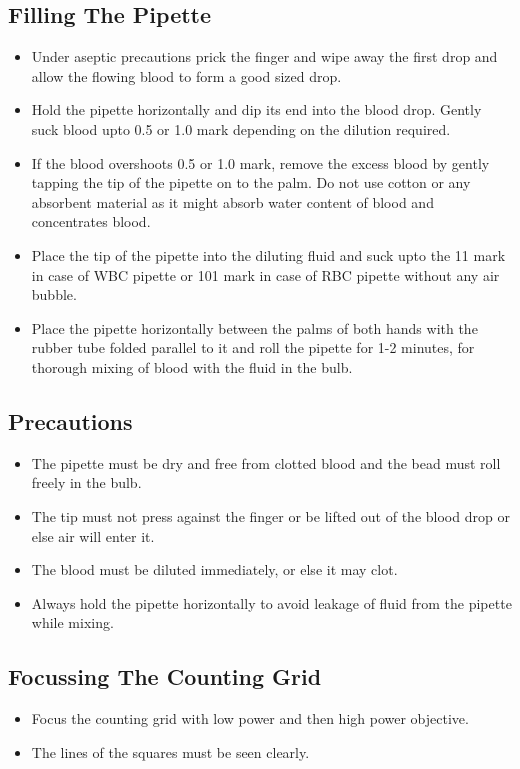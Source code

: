 \documentclass[a4paper,12pt]{book}
\begin{document}
\subsection*{Filling The Pipette}
\begin{itemize}

	\item{Under aseptic precautions prick the finger and wipe away the first drop and allow the flowing blood to form a good sized drop.}
	\item{Hold the pipette horizontally and dip its end into the blood drop. Gently suck blood upto 0.5 or 1.0 mark depending on the dilution required.}

	\item{If the blood overshoots 0.5 or 1.0 mark, remove the excess blood by gently tapping the tip of the pipette on to the palm. Do not use cotton or any absorbent material as it might absorb water content of blood and concentrates blood.}
	\item{Place the tip of the pipette into the diluting fluid and suck upto the 11 mark in case of WBC pipette or 101 mark in case of RBC pipette without any air bubble.}
	\item{Place the pipette horizontally between the palms of both hands with the rubber tube folded parallel to it and roll the pipette for 1-2 minutes, for thorough mixing of blood with the fluid in the bulb.}

\end{itemize}

\subsection*{Precautions}
\begin{itemize}

	\item{The pipette must be dry and free from clotted blood and the bead must roll freely in the bulb.}
	\item{The tip must not press against the finger or be lifted out of the blood drop or else air will enter it.}
	\item{The blood must be diluted immediately, or else it may clot.}
	\item{Always hold the pipette horizontally to avoid leakage of fluid from the pipette while mixing.}

\end{itemize}


\subsection*{Focussing The Counting Grid}
\begin{itemize}

	\item{	Focus the counting grid with low power and then high power objective.}
	\item{	The lines of the squares must be seen clearly.}
\end{itemize}
\end{document}
